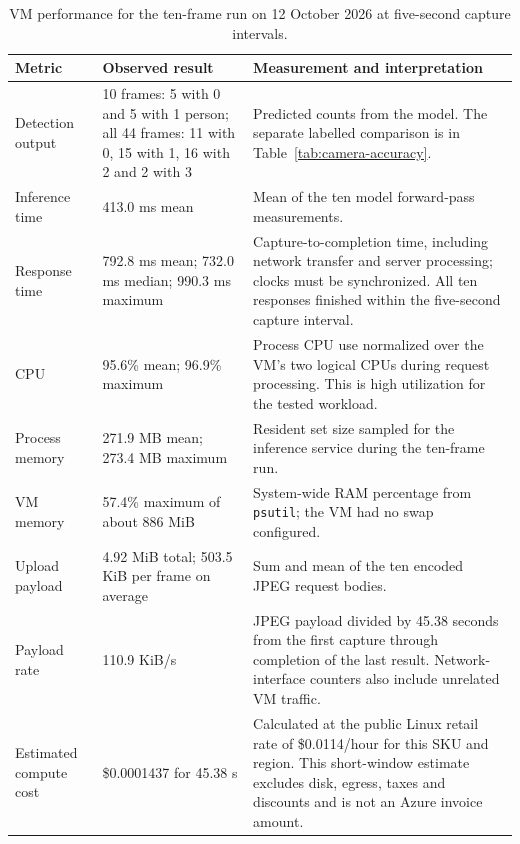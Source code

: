 \documentclass{article}
\begin{document}
    \begin{table}[H]
        \centering
        \small
        \begin{tabular}{p{4.2cm}p{3.0cm}p{6.2cm}}
            \toprule
            \textbf{Metric} & \textbf{Observed result} & \textbf{Measurement and interpretation} \\
            \midrule
            Detection output & 10 frames: 5 with 0 and 5 with 1 person; all 44 frames: 11 with 0, 15 with 1, 16 with 2 and 2 with 3 & Predicted counts from the model. The separate labelled comparison is in Table~\ref{tab:camera-accuracy}. \\
            Inference time & 413.0 ms mean & Mean of the ten model forward-pass measurements. \\
            Response time & 792.8 ms mean; 732.0 ms median; 990.3 ms maximum & Capture-to-completion time, including network transfer and server processing; clocks must be synchronized. All ten responses finished within the five-second capture interval. \\
            CPU & 95.6\% mean; 96.9\% maximum & Process CPU use normalized over the VM's two logical CPUs during request processing. This is high utilization for the tested workload. \\
            Process memory & 271.9 MB mean; 273.4 MB maximum & Resident set size sampled for the inference service during the ten-frame run. \\
            VM memory & 57.4\% maximum of about 886 MiB & System-wide RAM percentage from \texttt{psutil}; the VM had no swap configured. \\
            Upload payload & 4.92 MiB total; 503.5 KiB per frame on average & Sum and mean of the ten encoded JPEG request bodies. \\
            Payload rate & 110.9 KiB/s & JPEG payload divided by 45.38 seconds from the first capture through completion of the last result. Network-interface counters also include unrelated VM traffic. \\
            Estimated compute cost & \$0.0001437 for 45.38 s & Calculated at the public Linux retail rate of \$0.0114/hour for this SKU and region. This short-window estimate excludes disk, egress, taxes and discounts and is not an Azure invoice amount. \\
            \bottomrule
        \end{tabular}
        \caption{VM performance for the ten-frame run on 12 October 2026 at five-second capture intervals.}
        \label{tab:part2-performance}
    \end{table}
\end{document}
